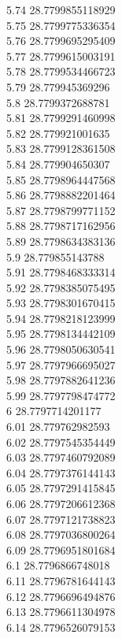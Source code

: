 {5.74	28.7799855118929\\
5.75	28.7799775336354\\
5.76	28.7799695295409\\
5.77	28.7799615003191\\
5.78	28.7799534466723\\
5.79	28.779945369296\\
5.8	28.7799372688781\\
5.81	28.7799291460998\\
5.82	28.779921001635\\
5.83	28.7799128361508\\
5.84	28.779904650307\\
5.85	28.7798964447568\\
5.86	28.7798882201464\\
5.87	28.7798799771152\\
5.88	28.7798717162956\\
5.89	28.7798634383136\\
5.9	28.779855143788\\
5.91	28.7798468333314\\
5.92	28.7798385075495\\
5.93	28.7798301670415\\
5.94	28.7798218123999\\
5.95	28.7798134442109\\
5.96	28.7798050630541\\
5.97	28.7797966695027\\
5.98	28.7797882641236\\
5.99	28.7797798474772\\
6	28.7797714201177\\
6.01	28.779762982593\\
6.02	28.7797545354449\\
6.03	28.7797460792089\\
6.04	28.7797376144143\\
6.05	28.7797291415845\\
6.06	28.7797206612368\\
6.07	28.7797121738823\\
6.08	28.7797036800264\\
6.09	28.7796951801684\\
6.1	28.7796866748018\\
6.11	28.7796781644143\\
6.12	28.7796696494876\\
6.13	28.7796611304978\\
6.14	28.7796526079153\\
}

